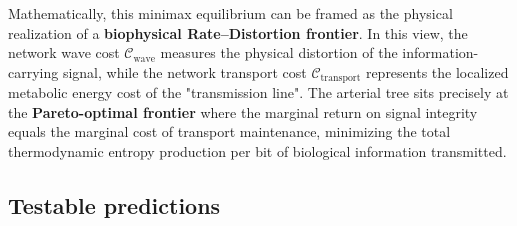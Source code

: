 \documentclass[11pt,a4paper]{article}
\theoremstyle{remark}
\begin{document}
Mathematically, this minimax equilibrium can be framed as the physical
realization of a \textbf{biophysical Rate--Distortion frontier}. In this view,
the network wave cost $\mathcal{C}_{\mathrm{wave}}$ measures the physical
distortion of the information-carrying signal, while the network transport cost
$\mathcal{C}_{\mathrm{transport}}$ represents the localized metabolic energy
cost of the "transmission line". The arterial tree sits precisely at the
\textbf{Pareto-optimal frontier} where the marginal return on signal integrity
equals the marginal cost of transport maintenance, minimizing the total
thermodynamic entropy production per bit of biological information transmitted.

\subsection{Testable predictions}
\end{document}
